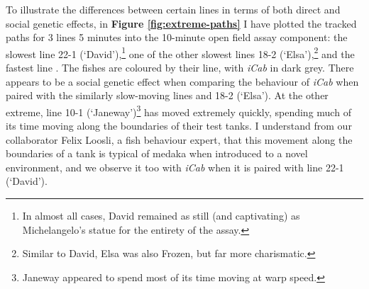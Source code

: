 \documentclass[
]{book}
\begin{document}
To illustrate the differences between certain lines in terms of both direct and social genetic effects, in \textbf{Figure \ref{fig:extreme-paths}} I have plotted the tracked paths for 3 lines 5 minutes into the 10-minute open field assay component: the slowest line \textcolor{22-1 (‘David’)_FB737A}{22-1 (‘David’)},\footnote{In almost all cases, David remained as still (and captivating) as Michelangelo's statue for the entirety of the assay.} one of the other slowest lines \textcolor{18-2 (‘Elsa’)_FF66A6}{18-2 (‘Elsa’)},\footnote{Similar to David, Elsa was also Frozen, but far more charismatic.} and the fastest line . The fishes are coloured by their line, with \emph{\textcolor{iCab_424B4D}{iCab}} in dark grey. There appears to be a social genetic effect when comparing the behaviour of \emph{\textcolor{iCab_424B4D}{iCab}} when paired with the similarly slow-moving lines and \textcolor{18-2 (‘Elsa’)_FF66A6}{18-2 (‘Elsa’)}. At the other extreme, line \textcolor{10-1 (‘Janeway’)_F8766D}{10-1 (‘Janeway’)}\footnote{Janeway appeared to spend most of its time moving at warp speed.} has moved extremely quickly, spending much of its time moving along the boundaries of their test tanks. I understand from our collaborator Felix Loosli, a fish behaviour expert, that this movement along the boundaries of a tank is typical of medaka when introduced to a novel environment, and we observe it too with \emph{\textcolor{iCab_424B4D}{iCab}} when it is paired with line \textcolor{22-1 (‘David’)_FB737A}{22-1 (‘David’)}.
\end{document}
